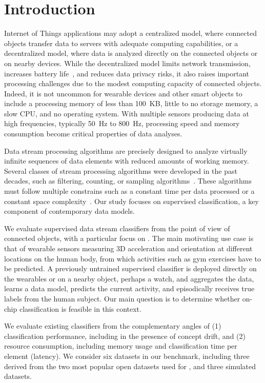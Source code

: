 \section{Introduction}
\label{sec:introduction}

Internet of Things applications may adopt a centralized model, where connected
objects transfer data to servers with adequate computing capabilities, or a
decentralized model, where data is analyzed directly on the connected objects or
on nearby devices. While the decentralized model limits network transmission,
increases battery life~\cite{sensor-network-survey, sensor-energy-model}, and
reduces data privacy risks, it also raises important processing challenges due
to the modest computing capacity of connected objects. Indeed, it is not
uncommon for wearable devices and other smart objects to include a processing
memory of less than 100~KB, little to no storage memory, a slow CPU, and no
operating system. With multiple sensors producing data at high frequencies,
typically 50~Hz to 800~Hz, processing speed and memory consumption become
critical properties of data analyses. 

Data stream processing algorithms are precisely designed to analyze virtually
infinite sequences of data elements with reduced amounts of working memory.
Several classes of stream processing algorithms were developed in the past
decades, such as filtering, counting, or sampling
algorithms~\cite{kejariwal2015}.  These algorithms must follow multiple
constrains such as a constant time per data processed or a constant space
complexity~\cite{issues_learning_from_stream}.  Our study focuses on supervised
classification, a key component of contemporary data models.

We evaluate supervised data stream classifiers from the point of view of
connected objects, with a particular focus on \har. The main motivating use case
is that of wearable sensors measuring 3D acceleration and orientation at
different locations on the human body, from which activities such as gym
exercises have to be predicted. A previously untrained supervised classifier is
deployed directly on the wearables or on a nearby object, perhaps a watch, and
aggregates the data, learns a data model, predicts the current activity, and
episodically receives true labels from the human subject. Our main question is
to determine whether on-chip classification is feasible in this context. 

We evaluate existing classifiers from the complementary angles of (1)
classification performance, including in the presence of concept drift, and
(2) resource consumption, including memory usage and classification time
per element (latency). We consider six datasets in our benchmark, including
three derived from the two most popular open datasets used for \har, and
three simulated datasets.


